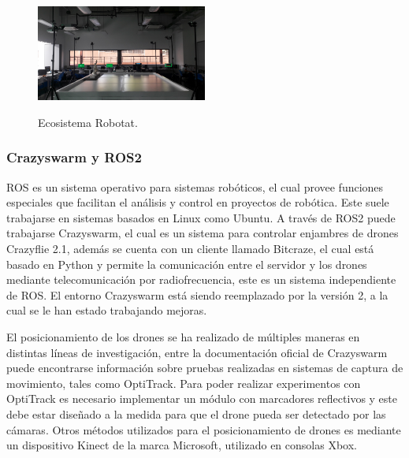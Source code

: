 \begin{figure}[t]
    \centering
    \includegraphics[width=0.5\textwidth]{figuras/Robotat.png}
    \caption{Ecosistema Robotat.}
    \cite{Camilo2022_tesis}
    \label{fig:Robotat}
\end{figure}

\subsubsection{Crazyswarm y ROS2}

ROS es un sistema operativo para sistemas robóticos, el cual provee funciones especiales que facilitan el análisis y control en proyectos de robótica. Este suele trabajarse en sistemas basados en Linux como Ubuntu. A través de ROS2 puede trabajarse Crazyswarm, el cual es un sistema para controlar enjambres de drones Crazyflie 2.1, además se cuenta con un cliente llamado Bitcraze, el cual está basado en Python y permite la comunicación entre el servidor y los drones mediante telecomunicación por radiofrecuencia, este es un sistema independiente de ROS. El entorno Crazyswarm está siendo reemplazado por la versión 2, a la cual se le han estado trabajando mejoras. 

El posicionamiento de los drones se ha realizado de múltiples maneras en distintas líneas de investigación, entre la documentación oficial de Crazyswarm puede encontrarse información sobre pruebas realizadas en sistemas de captura de movimiento, tales como OptiTrack. Para poder realizar experimentos con OptiTrack es necesario implementar un módulo con marcadores reflectivos y este debe estar diseñado a la medida para que el drone pueda ser detectado por las cámaras. Otros métodos utilizados para el posicionamiento de drones es mediante un dispositivo Kinect de la marca Microsoft, utilizado en consolas Xbox. \cite{Crazyswarm}

